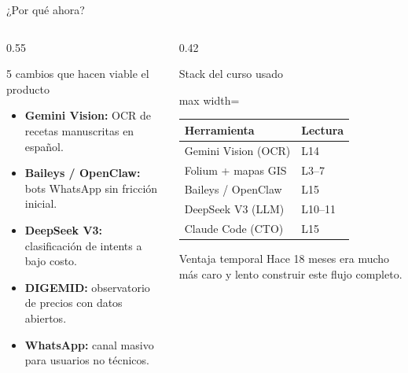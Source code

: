 \documentclass[aspectratio=169,11pt]{beamer}
\newcommand{\tightlist}{\setlength\itemsep{2pt}\setlength\parskip{0pt}\setlength\parsep{0pt}}
\begin{document}
\begin{frame}[t]{¿Por qué ahora?}
\vspace{-0.3em}
\begin{columns}[T,onlytextwidth]
\begin{column}{0.55\textwidth}
\begin{block}{5 cambios que hacen viable el producto}
\begin{itemize}\tightlist
  \item \textbf{Gemini Vision:} OCR de recetas manuscritas en español.
  \item \textbf{Baileys / OpenClaw:} bots WhatsApp sin fricción inicial.
  \item \textbf{DeepSeek V3:} clasificación de intents a bajo costo.
  \item \textbf{DIGEMID:} observatorio de precios con datos abiertos.
  \item \textbf{WhatsApp:} canal masivo para usuarios no técnicos.
\end{itemize}
\end{block}
\end{column}
\begin{column}{0.42\textwidth}
\begin{block}{Stack del curso usado}
\begin{adjustbox}{max width=\linewidth}
\begin{tabular}{ll}
\toprule
\textbf{Herramienta} & \textbf{Lectura} \\
\midrule
Gemini Vision (OCR) & L14 \\
Folium + mapas GIS & L3--7 \\
Baileys / OpenClaw & L15 \\
DeepSeek V3 (LLM) & L10--11 \\
Claude Code (CTO) & L15 \\
\bottomrule
\end{tabular}
\end{adjustbox}
\end{block}
\vspace{0.25em}
\begin{alertblock}{Ventaja temporal}
Hace 18 meses era mucho más caro y lento construir este flujo completo.
\end{alertblock}
\end{column}
\end{columns}
\end{frame}
\end{document}
